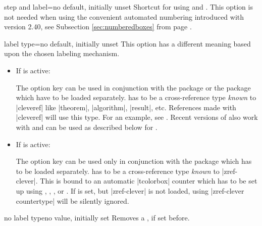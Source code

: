 \begin{docTcbKey}{step and label}{=}{no default, initially unset}
Shortcut for using  and . This option is not needed when
using the convenient automated numbering introduced with version 2.40,
see Subsection \ref{sec:numberedboxes}
from page \pageref{sec:numberedboxes}.
\end{docTcbKey}


\begin{docTcbKey}[][doc updated=2024-10-22]{label type}{=}{no default, initially unset}
This option has a different meaning based upon the chosen labeling mechanism.
\begin{itemize}
\item If  is active:\par
  The option key  can be used in conjunction with the  package
  \cite{cubitt:2018a} or the  package \cite{barros:zref-clever}
  which have to be loaded separately.
   has to be a cross-reference type \emph{known} to |cleveref|
  like |theorem|, |algorithm|, |result|, etc. References made with |cleveref|
  will use this type. For an example, see .
  Recent versions of  also work with 
  and  can be used as described below for .
\item If  is active:\par
  The option key  can be used only in conjunction with the
   package \cite{barros:zref-clever}
  which has to be loaded separately.
   has to be a cross-reference type \emph{known} to |zref-clever|.
  This  is bound to an automatic |tcolorbox| counter which has to be set up using
  ,
  ,
  , or
  .
  If  is set, but |zref-clever| is not loaded,
  using |zref-clever countertype| will be silently ignored.
\end{itemize}
\end{docTcbKey}


\begin{docTcbKey}[][doc updated=2023-02-09]{no label type}{}{no value, initially set}
Removes a , if set before.
\end{docTcbKey}



